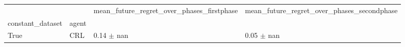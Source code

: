 \begin{tabular}{llll}
\toprule
 &  & mean_future_regret_over_phases_firstphase & mean_future_regret_over_phases_secondphase \\
constant_dataset & agent &  &  \\
\midrule
True & CRL & 0.14 $\pm$ nan & 0.05 $\pm$ nan \\
\cline{1-4}
\bottomrule
\end{tabular}
